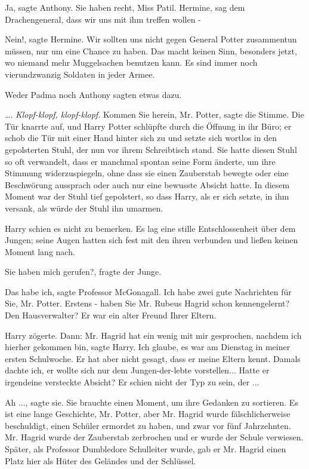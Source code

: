 \glqq Ja\grqq{}, sagte Anthony. \glqq Sie haben recht, Miss Patil. Hermine, sag
dem Drachengeneral, dass wir uns mit ihm treffen wollen -\grqq{}

\glqq Nein!\grqq{}, sagte Hermine. \glqq Wir sollten uns nicht gegen General
Potter zusammentun müssen, nur um eine Chance zu haben. Das macht keinen Sinn,
besonders jetzt, wo niemand mehr Muggelsachen benutzen kann. Es sind immer noch
vierundzwanzig Soldaten in jeder Armee.\grqq{}

Weder Padma noch Anthony sagten etwas dazu.

….
\emph{Klopf-klopf, klopf-klopf.}
\glqq Kommen Sie herein, Mr. Potter\grqq{}, sagte die Stimme. Die Tür knarrte
auf, und Harry Potter schlüpfte durch die Öffnung in ihr Büro; er schob die Tür
mit einer Hand hinter sich zu und setzte sich wortlos in den gepolsterten Stuhl,
der nun vor ihrem Schreibtisch stand. Sie hatte diesen Stuhl so oft verwandelt,
dass er manchmal spontan seine Form änderte, um ihre Stimmung widerzuspiegeln,
ohne dass sie einen Zauberstab bewegte oder eine Beschwörung aussprach oder auch
nur eine bewusste Absicht hatte. In diesem Moment war der Stuhl tief gepolstert,
so dass Harry, als er sich setzte, in ihm versank, als würde der Stuhl ihn
umarmen.

Harry schien es nicht zu bemerken. Es lag eine stille Entschlossenheit über dem
Jungen; seine Augen hatten sich fest mit den ihren verbunden und ließen keinen
Moment lang nach.

\glqq Sie haben mich gerufen?\grqq{}, fragte der Junge.

\glqq Das habe ich\grqq{}, sagte Professor McGonagall. \glqq Ich habe zwei gute
Nachrichten für Sie, Mr. Potter. Erstens - haben Sie Mr. Rubeus Hagrid schon
kennengelernt? Den Hausverwalter? Er war ein alter Freund Ihrer Eltern.\grqq{}

Harry zögerte. Dann: \glqq Mr. Hagrid hat ein wenig mit mir gesprochen, nachdem
ich hierher gekommen bin\grqq{}, sagte Harry. \glqq Ich glaube, es war am
Dienstag in meiner ersten Schulwoche. Er hat aber nicht gesagt, dass er meine
Eltern kennt. Damals dachte ich, er wollte sich nur dem Jungen-der-lebte
vorstellen... Hatte er irgendeine versteckte Absicht? Er schien nicht der Typ zu
sein, der ...\grqq{}

\glqq Ah ...\grqq{}, sagte sie. Sie brauchte einen Moment, um ihre Gedanken zu
sortieren. \glqq Es ist eine lange Geschichte, Mr. Potter, aber Mr. Hagrid wurde
fälschlicherweise beschuldigt, einen Schüler ermordet zu haben, und zwar vor
fünf Jahrzehnten. Mr. Hagrid wurde der Zauberstab zerbrochen und er wurde der
Schule verwiesen. Später, als Professor Dumbledore Schulleiter wurde, gab er Mr.
Hagrid einen Platz hier als Hüter des Geländes und der Schlüssel.\grqq{}

